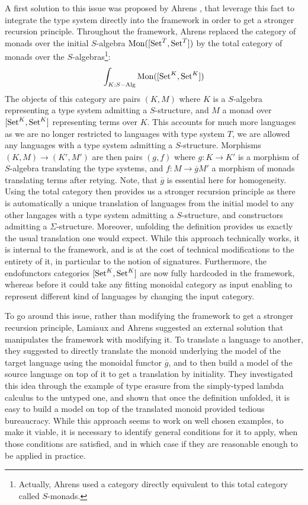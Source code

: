 A first solution to this issue was proposed by Ahrens \cite{ExtendedInitiality12},
that leverage this fact to integrate the type system directly into the framework
in order to get a stronger recursion principle.
Throughout the framework, Ahrens replaced the category of monads over the
initial $S$-algebra $\operatorname{Mon}([\operatorname{Set}^{T},\operatorname{Set}^{T}])$ by the total category of
monads over the $S$-algebras\footnote{
  Actually, Ahrens used a category directly equivalent to this total
  category called $S$-monads.}:
%
\[\int_{K : S-\mathrm{Alg}} \operatorname{Mon}([\operatorname{Set}^K,\operatorname{Set}^K]) \]
%
The objects of this category are pairs $(K,M)$ where $K$ is a $S$-algebra
representing a type system admitting a $S$-structure, and $M$ a monad over
$[\operatorname{Set}^{K},\operatorname{Set}^{K}]$ representing terms over $K$.
This accounts for much more languages as we are no longer restricted to
languages with type system $T$, we are allowed any languages with a type
system admitting a $S$-structure.
Morphisms $(K,M) → (K',M')$ are then pairs $(g,f)$ where $g : K → K'$ is
a morphism of $S$-algebra translating the type systems, and $f : M → \overline{g}M'$
a morphism of monads translating terms after retying.
Note, that $\overline{g}$ is essential here for homogeneity.
Using the total category then provides us a stronger recursion principle as
there is automatically a unique translation of languages from the initial model
to any other langages with a type system admitting a $S$-structure, and constructors admitting a $\Sigma$-structure.
Moreover, unfolding the definition provides us exactly the usual translation one would expect.
While this approach technically works, it is internal to the framework, and
is at the cost of technical modifications to the entirety of it, in
particular to the notion of signatures.
Furthermore, the endofunctors categories $[\operatorname{Set}^K,\operatorname{Set}^K]$ are now fully hardcoded
in the framework, whereas before it could take any fitting monoidal category as input
enabling to represent different kind of languages by changing the input category.

To go around this issue, rather than modifying the framework to get a
stronger recursion principle, Lamiaux and Ahrens \cite[Section 9.4]{IntroductionIS24}
suggested an external solution that manipulates the framework with modifying it.
To translate a language to another, they suggested to directly translate the
monoid underlying the model of the target language using the monoidal
functor $\overline{g}$, and to then build a model of the source language on
top of it to get a translation by initiality.
They investigated this idea through the example of type erasure from the
simply-typed lambda calculus to the untyped one, and shown that once the
definition unfolded, it is easy to build a model on top of the translated
monoid provided tedious bureaucracy.
%
While this approach seems to work on well chosen examples, to make it
viable, it is necessary to identify general conditions for it to apply, when
those conditions are satisfied, and in which case if they are reasonable
enough to be applied in practice.

